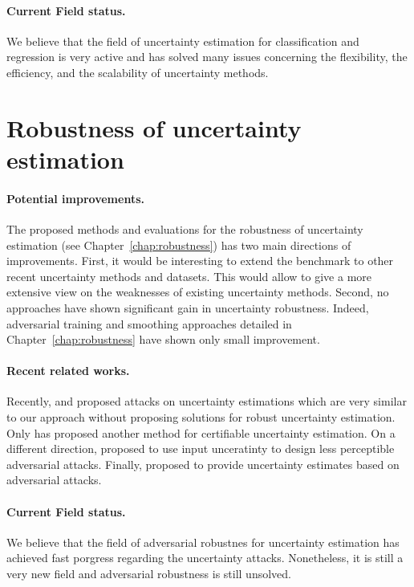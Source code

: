 \paragraph{Current Field status.} We believe that the field of uncertainty estimation for classification and regression is very active and has solved many issues concerning the flexibility, the efficiency, and the scalability of uncertainty methods.

\section{Robustness of uncertainty estimation} 

\paragraph{Potential improvements.} The proposed methods and evaluations for the robustness of uncertainty estimation (see Chapter~\ref{chap:robustness}) has two main directions of improvements. First, it would be interesting to extend the benchmark to other recent uncertainty methods and datasets. This would allow to give a more extensive view on the weaknesses of existing uncertainty methods. Second, no approaches have shown significant gain in uncertainty robustness. Indeed, adversarial training and smoothing approaches detailed in Chapter~\ref{chap:robustness} have shown only small improvement.

\paragraph{Recent related works.} Recently, \cite{galil2021disrupting} and \cite{huimin2022attackingOOD} proposed attacks on uncertainty estimations which are very similar to our approach without proposing solutions for robust uncertainty estimation. Only \cite{meinke2021provably} has proposed another method for certifiable uncertainty estimation. On a different direction, \cite{dia2021localizeduncertainty} proposed to use input unceratinty to design less perceptible adversarial attacks. Finally, \cite{alarab2021attackucertainty} proposed to provide uncertainty estimates based on adversarial attacks.

\paragraph{Current Field status.} We believe that the field of adversarial robustnes for uncertainty estimation has achieved fast porgress regarding the uncertainty attacks. Nonetheless, it is still a very new field and adversarial robustness is still unsolved. 

